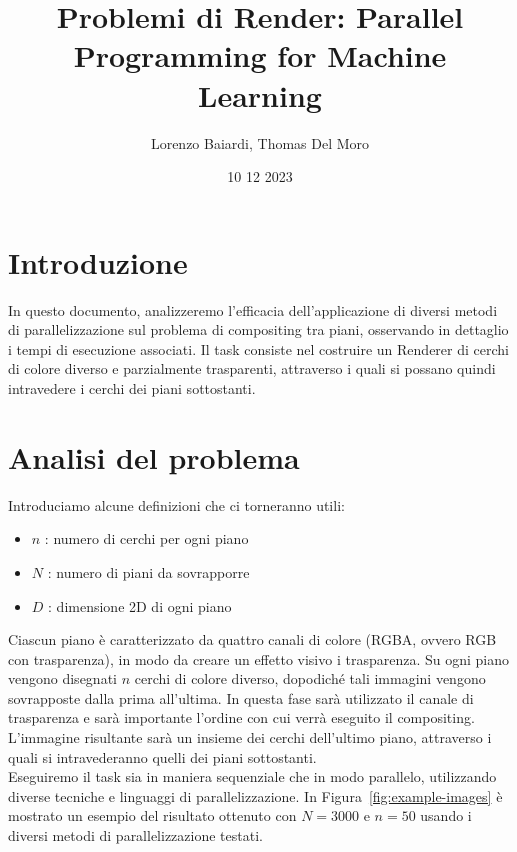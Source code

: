 \documentclass[11pt]{article}
\title{Problemi di Render: Parallel Programming for Machine Learning}
\author{Lorenzo Baiardi, Thomas Del Moro}
\date{10 12 2023}
\begin{document}
    \maketitle

    \section{Introduzione}\label{sec:introduzione}
    In questo documento, analizzeremo l'efficacia dell'applicazione di diversi metodi di parallelizzazione
    sul problema di compositing tra piani, osservando in dettaglio i tempi di esecuzione associati.
    Il task consiste nel costruire un Renderer di cerchi di colore diverso e parzialmente trasparenti,
    attraverso i quali si possano quindi intravedere i cerchi dei piani sottostanti.

    \section{Analisi del problema}\label{sec:analisi-del-problema}
    Introduciamo alcune definizioni che ci torneranno utili:
    \begin{itemize}
        \item $n$ : numero di cerchi per ogni piano
        \item $N$ : numero di piani da sovrapporre
        \item $D$ : dimensione 2D di ogni piano
    \end{itemize}
    Ciascun piano è caratterizzato da quattro canali di colore (RGBA, ovvero RGB con trasparenza),
    in modo da creare un effetto visivo i trasparenza.
    Su ogni piano vengono disegnati $n$ cerchi di colore diverso, dopodiché tali immagini vengono sovrapposte dalla
    prima all'ultima.
    In questa fase sarà utilizzato il canale di trasparenza e sarà importante l'ordine con cui verrà eseguito il compositing.
    L'immagine risultante sarà un insieme dei cerchi dell'ultimo piano, attraverso i quali si intravederanno quelli
    dei piani sottostanti.\\

    Eseguiremo il task sia in maniera sequenziale che in modo parallelo, utilizzando diverse tecniche e linguaggi di parallelizzazione.
    In Figura~\ref{fig:example-images} è mostrato un esempio del risultato ottenuto con $N=3000$ e $n=50$ usando i
    diversi metodi di parallelizzazione testati.
\end{document}
